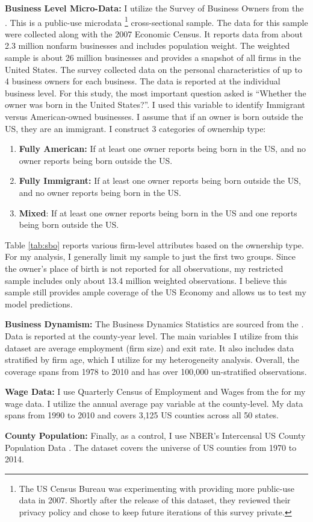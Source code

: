 {\large\textbf{Business Level Micro-Data:}} I utilize the Survey of Business Owners from the \cite{sbo}. This is a public-use microdata \footnote{The US Census Bureau was experimenting with providing more public-use data in 2007. Shortly after the release of this dataset, they reviewed their privacy policy and chose to keep future iterations of this survey private. }  cross-sectional sample. The data for this sample were collected along with the 2007 Economic Census. It reports data from about 2.3 million nonfarm businesses and includes population weight. The weighted sample is about 26 million businesses and provides a snapshot of all firms in the United States. The survey collected data on the personal characteristics of up to 4 business owners for each business. The data is reported at the individual business level. For this study, the most important question asked is ``Whether the owner was born in the United States?''. I used this variable to identify Immigrant versus American-owned businesses. I assume that if an owner is born outside the US, they are an immigrant. I construct 3 categories of ownership type:
    \begin{enumerate}[1)]
        \item \textbf{Fully American:} If at least one owner reports being born in the US, and no owner reports being born outside the US.
        \item \textbf{Fully Immigrant:} If at least one owner reports being born outside the US, and no owner reports being born in the US.
        \item \textbf{Mixed}: If at least one owner reports being born in the US and one reports being born outside the US.
    \end{enumerate}
    Table \ref{tab:sbo} reports various firm-level attributes based on the ownership type. For my analysis, I generally limit my sample to just the first two groups. Since the owner's place of birth is not reported for all observations, my restricted sample includes only about 13.4 million weighted observations. I believe this sample still provides ample coverage of the US Economy and allows us to test my model predictions.

{\large\textbf{Business Dynamism:}}  The Business Dynamics Statistics are sourced from the \cite{bds}. Data is reported at the county-year level. The main variables I utilize from this dataset are average employment (firm size) and exit rate. It also includes data stratified by firm age, which I utilize for my heterogeneity analysis. Overall, the coverage spans from 1978 to 2010 and has over 100,000 un-stratified observations.

{\large \textbf{Wage Data:}} I use Quarterly Census of Employment and Wages from the \cite{bls} for my wage data. I utilize the annual average pay variable at the county-level. My data spans from 1990 to 2010 and covers 3,125 US counties across all 50 states.

{\large \textbf{County Population:}} Finally, as a control, I use NBER's Intercensal US County Population Data \citep{countpop}. The dataset covers the universe of US counties from 1970 to 2014.
